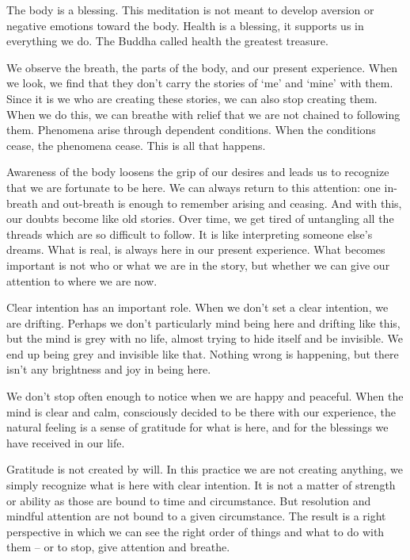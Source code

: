 The body is a blessing. This meditation is not meant to develop aversion
or negative emotions toward the body. Health is a blessing, it supports
us in everything we do. The Buddha called health the greatest treasure.


We observe the breath, the parts of the body, and our present
experience. When we look, we find that they don't carry the stories of
`me' and `mine' with them. Since it is we who are creating these
stories, we can also stop creating them. When we do this, we can breathe
with relief that we are not chained to following them. Phenomena arise
through dependent conditions. When the conditions cease, the phenomena
cease. This is all that happens.

Awareness of the body loosens the grip of our desires and leads us to
recognize that we are fortunate to be here. We can always return to this
attention: one in-breath and out-breath is enough to remember arising
and ceasing. And with this, our doubts become like old stories. Over
time, we get tired of untangling all the threads which are so difficult
to follow. It is like interpreting someone else's dreams. What is real,
is always here in our present experience. What becomes important is not
who or what we are in the story, but whether we can give our attention
to where we are now.

Clear intention has an important role. When we don't set a clear
intention, we are drifting. Perhaps we don't particularly mind being
here and drifting like this, but the mind is grey with no life, almost
trying to hide itself and be invisible. We end up being grey and
invisible like that. Nothing wrong is happening, but there isn't any
brightness and joy in being here.

We don't stop often enough to notice when we are happy and peaceful.
When the mind is clear and calm, consciously decided to be there with
our experience, the natural feeling is a sense of gratitude for what is
here, and for the blessings we have received in our life.

Gratitude is not created by will. In this practice we are not creating
anything, we simply recognize what is here with clear intention. It is
not a matter of strength or ability as those are bound to time and
circumstance. But resolution and mindful attention are not bound to a
given circumstance. The result is a right perspective in which we can
see the right order of things and what to do with them -- or to stop,
give attention and breathe.
